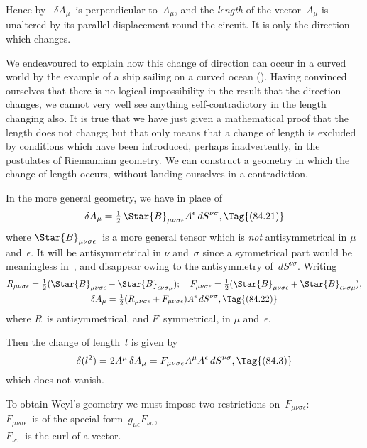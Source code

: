 \documentclass[12pt]{book}
\begin{document}
Hence by~ $\delta A_{\mu}$~is perpendicular to~$A_{\mu}$, and the \emph{length} of the vector~$A_{\mu}$
is unaltered by its parallel displacement round the circuit. It is only the
direction which changes.

We endeavoured to explain how this change of direction can occur in a
curved world by the example of a ship sailing on a curved ocean (). Having
convinced ourselves that there is no logical impossibility in the result that the
direction changes, we cannot very well see anything self\hyp{}contradictory in the
length changing also. It is true that we have just given a mathematical proof
that the length does not change; but that only means that a change of length
is excluded by conditions which have been introduced, perhaps inadvertently,
in the postulates of Riemannian geometry. We can construct a geometry in
which the change of length occurs, without landing ourselves in a contradiction.

In the more general geometry, we have in place of~
\[
\delta A_{\mu} = \tfrac{1}{2}\, \Star{B}_{\mu\nu\sigma\epsilon} A^{\epsilon}\, dS^{\nu\sigma},
\Tag{(84.21)}
\]
where $\Star{B}_{\mu\nu\sigma\epsilon}$~is a more general tensor which is \emph{not} antisymmetrical in $\mu$ and~$\epsilon$.
It will be antisymmetrical in $\nu$ and~$\sigma$ since a symmetrical part would be
meaningless in~, and disappear owing to the antisymmetry of~$dS^{\nu\sigma}$.
Writing
\begin{gather*}
  R_{\mu\nu\sigma\epsilon} = \tfrac{1}{2}(\Star{B}_{\mu\nu\sigma\epsilon} - \Star{B}_{\epsilon\nu\sigma\mu});\quad
  F_{\mu\nu\sigma\epsilon} = \tfrac{1}{2}(\Star{B}_{\mu\nu\sigma\epsilon} + \Star{B}_{\epsilon\nu\sigma\mu}), \\
  \delta A_{\mu} = \tfrac{1}{2}(R_{\mu\nu\sigma\epsilon} + F_{\mu\nu\sigma\epsilon}) A^{\epsilon}\, dS^{\nu\sigma},
  \Tag{(84.22)}
\end{gather*}
where $R$~is antisymmetrical, and $F$~symmetrical, in $\mu$ and~$\epsilon$.

Then the change of length~$l$ is given by
\[
\delta(l^{2}) = 2A^{\mu}\, \delta A_{\mu}
= F_{\mu\nu\sigma\epsilon} A^{\mu} A^{\epsilon}\, dS^{\nu\sigma},
\Tag{(84.3)}
\]
which does not vanish.

To obtain Weyl's geometry we must impose two restrictions on~$F_{\mu\nu\sigma\epsilon}$: \\
\Indent{} $F_{\mu\nu\sigma\epsilon}$~is of the special form~$g_{\mu\epsilon}F_{\nu\sigma}$, \\
\Indent{} $F_{\nu\sigma}$~is the curl of a vector.
\end{document}
